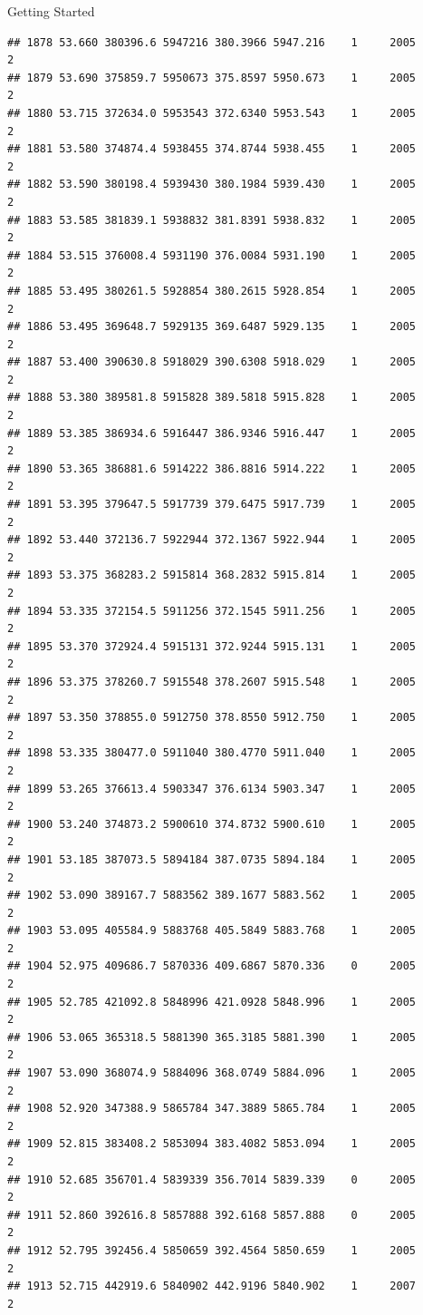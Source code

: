 \documentclass[
  ignorenonframetext,
]{beamer}
\begin{document}
\begin{frame}[fragile]{Getting Started}
\begin{verbatim}
## 1878 53.660 380396.6 5947216 380.3966 5947.216    1     2005        2
## 1879 53.690 375859.7 5950673 375.8597 5950.673    1     2005        2
## 1880 53.715 372634.0 5953543 372.6340 5953.543    1     2005        2
## 1881 53.580 374874.4 5938455 374.8744 5938.455    1     2005        2
## 1882 53.590 380198.4 5939430 380.1984 5939.430    1     2005        2
## 1883 53.585 381839.1 5938832 381.8391 5938.832    1     2005        2
## 1884 53.515 376008.4 5931190 376.0084 5931.190    1     2005        2
## 1885 53.495 380261.5 5928854 380.2615 5928.854    1     2005        2
## 1886 53.495 369648.7 5929135 369.6487 5929.135    1     2005        2
## 1887 53.400 390630.8 5918029 390.6308 5918.029    1     2005        2
## 1888 53.380 389581.8 5915828 389.5818 5915.828    1     2005        2
## 1889 53.385 386934.6 5916447 386.9346 5916.447    1     2005        2
## 1890 53.365 386881.6 5914222 386.8816 5914.222    1     2005        2
## 1891 53.395 379647.5 5917739 379.6475 5917.739    1     2005        2
## 1892 53.440 372136.7 5922944 372.1367 5922.944    1     2005        2
## 1893 53.375 368283.2 5915814 368.2832 5915.814    1     2005        2
## 1894 53.335 372154.5 5911256 372.1545 5911.256    1     2005        2
## 1895 53.370 372924.4 5915131 372.9244 5915.131    1     2005        2
## 1896 53.375 378260.7 5915548 378.2607 5915.548    1     2005        2
## 1897 53.350 378855.0 5912750 378.8550 5912.750    1     2005        2
## 1898 53.335 380477.0 5911040 380.4770 5911.040    1     2005        2
## 1899 53.265 376613.4 5903347 376.6134 5903.347    1     2005        2
## 1900 53.240 374873.2 5900610 374.8732 5900.610    1     2005        2
## 1901 53.185 387073.5 5894184 387.0735 5894.184    1     2005        2
## 1902 53.090 389167.7 5883562 389.1677 5883.562    1     2005        2
## 1903 53.095 405584.9 5883768 405.5849 5883.768    1     2005        2
## 1904 52.975 409686.7 5870336 409.6867 5870.336    0     2005        2
## 1905 52.785 421092.8 5848996 421.0928 5848.996    1     2005        2
## 1906 53.065 365318.5 5881390 365.3185 5881.390    1     2005        2
## 1907 53.090 368074.9 5884096 368.0749 5884.096    1     2005        2
## 1908 52.920 347388.9 5865784 347.3889 5865.784    1     2005        2
## 1909 52.815 383408.2 5853094 383.4082 5853.094    1     2005        2
## 1910 52.685 356701.4 5839339 356.7014 5839.339    0     2005        2
## 1911 52.860 392616.8 5857888 392.6168 5857.888    0     2005        2
## 1912 52.795 392456.4 5850659 392.4564 5850.659    1     2005        2
## 1913 52.715 442919.6 5840902 442.9196 5840.902    1     2007        2

\end{verbatim}
\end{frame}
\end{document}
